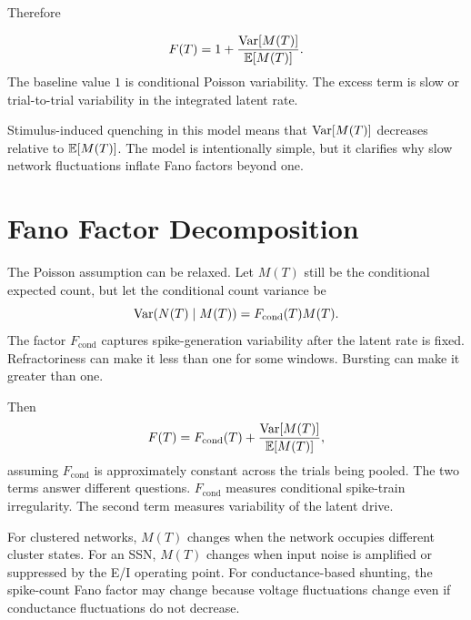 Therefore
%
\begin{keyequation}
\begin{equation}
  F(T)
  =
  1
  +
  \frac{\operatorname{Var}[M(T)]}{\mathbb{E}[M(T)]}.
  \label{eq:cox-fano}
\end{equation}
\tcblower
The baseline value $1$ is conditional Poisson variability. The excess term is slow or trial-to-trial variability in the integrated latent rate.
\end{keyequation}

Stimulus-induced quenching in this model means that $\operatorname{Var}[M(T)]$ decreases relative to $\mathbb{E}[M(T)]$. The model is intentionally simple, but it clarifies why slow network fluctuations inflate Fano factors beyond one.

\section{Fano Factor Decomposition}
\label{sec:fano-factor-decomposition-ch17}

The Poisson assumption can be relaxed. Let $M(T)$ still be the conditional expected count, but let the conditional count variance be
%
\begin{equation}
  \operatorname{Var}(N(T)\mid M(T))
  =
  F_{\mathrm{cond}}(T)M(T).
  \label{eq:conditional-fano-general}
\end{equation}
%
The factor $F_{\mathrm{cond}}$ captures spike-generation variability after the latent rate is fixed. Refractoriness can make it less than one for some windows. Bursting can make it greater than one.

Then
%
\begin{equation}
  F(T)
  =
  F_{\mathrm{cond}}(T)
  +
  \frac{\operatorname{Var}[M(T)]}{\mathbb{E}[M(T)]},
  \label{eq:general-fano-decomposition}
\end{equation}
%
assuming $F_{\mathrm{cond}}$ is approximately constant across the trials being pooled. The two terms answer different questions. $F_{\mathrm{cond}}$ measures conditional spike-train irregularity. The second term measures variability of the latent drive.

For clustered networks, $M(T)$ changes when the network occupies different cluster states. For an SSN, $M(T)$ changes when input noise is amplified or suppressed by the E/I operating point. For conductance-based shunting, the spike-count Fano factor may change because voltage fluctuations change even if conductance fluctuations do not decrease.

